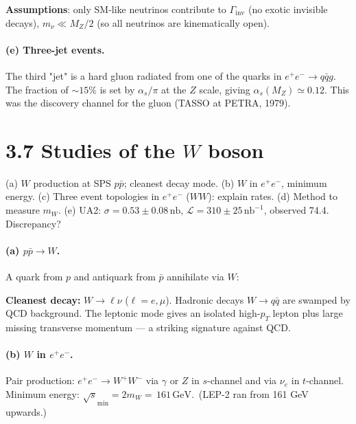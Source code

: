 \documentclass[11pt]{article}
\newcommand{\Q}[1]{\begin{question}#1\end{question}}
\newcommand{\GeV}{\,\mathrm{GeV}}
\newcommand{\fphoton}[2]{\draw[decorate, decoration={snake, amplitude=0.6mm, segment length=2mm}] (#1) -- (#2);}
\begin{document}
\textbf{Assumptions}: only SM-like neutrinos contribute to $\Gamma_\mathrm{inv}$ (no exotic invisible decays), $m_\nu\ll M_Z/2$ (so all neutrinos are kinematically open).

\paragraph{(e) Three-jet events.} The third "jet" is a hard gluon radiated from one of the quarks in $e^+e^-\to q\bar q g$. The fraction of $\sim 15\%$ is set by $\alpha_s/\pi$ at the $Z$ scale, giving $\alpha_s(M_Z)\simeq 0.12$. This was the discovery channel for the gluon (TASSO at PETRA, 1979).

\section*{3.7 \quad Studies of the $W$ boson}

\Q{(a) $W$ production at SPS $p\bar p$; cleanest decay mode. (b) $W$ in $e^+e^-$, minimum energy. (c) Three event topologies in $e^+e^-$ ($WW$): explain rates. (d) Method to measure $m_W$. (e) UA2: $\sigma=0.53\pm 0.08\,\mathrm{nb}$, $\mathcal{L}=310\pm 25\,\mathrm{nb^{-1}}$, observed 74.4. Discrepancy?}

\paragraph{(a) $p\bar p\to W$.} A quark from $p$ and antiquark from $\bar p$ annihilate via $W$:
\begin{center}
\end{center}
\textbf{Cleanest decay:} $W\to\ell\nu$ ($\ell=e,\mu$). Hadronic decays $W\to q\bar q$ are swamped by QCD background. The leptonic mode gives an isolated high-$p_T$ lepton plus large missing transverse momentum --- a striking signature against QCD.

\paragraph{(b) $W$ in $e^+e^-$.} Pair production: $e^+e^-\to W^+W^-$ via $\gamma$ or $Z$ in $s$-channel and via $\nu_e$ in $t$-channel. Minimum energy: $\sqrt{s}_\mathrm{min}=2m_W=\boxed{\,161\GeV.\,}$ (LEP-2 ran from 161 GeV upwards.)
\end{document}
